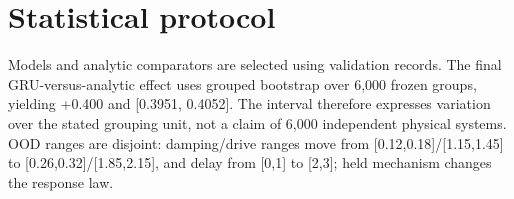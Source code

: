 \section{Statistical protocol}
Models and analytic comparators are selected using validation records. The final GRU-versus-analytic effect uses grouped bootstrap over 6,000 frozen groups, yielding +0.400 and [0.3951, 0.4052]. The interval therefore expresses variation over the stated grouping unit, not a claim of 6,000 independent physical systems. OOD ranges are disjoint: damping/drive ranges move from [0.12,0.18]/[1.15,1.45] to [0.26,0.32]/[1.85,2.15], and delay from [0,1] to [2,3]; held mechanism changes the response law.
